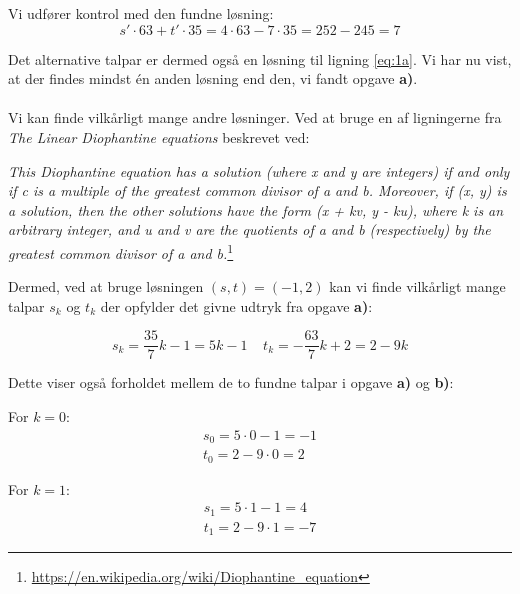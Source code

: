 Vi udfører kontrol med den fundne løsning: 
\begin{equation*}
   s' \cdot 63 + t' \cdot 35  =  4 \cdot 63 - 7 \cdot 35 = 252 - 245 = 7
\end{equation*}

Det alternative talpar er dermed også en løsning til ligning \eqref{eq:1a}. Vi har nu vist, at der findes mindst én anden løsning end den, vi fandt opgave \textbf{a)}. \\
\\
Vi kan finde vilkårligt mange andre løsninger. Ved at bruge en af ligningerne fra \textit{The Linear Diophantine equations} beskrevet ved: 

\begin{center}
\textit{This Diophantine equation has a solution (where x and y are integers) if and only if c is a multiple of the greatest common divisor of a and b. Moreover, if (x, y) is a solution, then the other solutions have the form (x + kv, y - ku), where k is an arbitrary integer, and u and v are the quotients of a and b (respectively) by the greatest common divisor of a and b.}\footnote{\url{https://en.wikipedia.org/wiki/Diophantine_equation}}
\end{center}

Dermed, ved at bruge løsningen $(s,t)=(-1, 2)$ kan vi finde vilkårligt mange talpar $s_k$ og $t_k$ der opfylder det givne udtryk fra opgave \textbf{a)}: 

\begin{equation*}
    s_k = \frac{35}{7}k -1 = 5k-1  \; \; \; \; t_k = -\frac{63}{7}k + 2 = 2-9k
\end{equation*}

Dette viser også forholdet mellem de to fundne talpar i opgave \textbf{a)} og \textbf{b)}: 

For $k = 0$:
\begin{gather*}
    s_{0} = 5 \cdot 0 -1 = -1 \\
    t_{0} = 2-9 \cdot 0 = 2
\end{gather*}

For $k = 1$: 
\begin{gather*}
    s_{1} = 5 \cdot 1 -1 = 4 \\
    t_{1} =2 -9 \cdot 1 = -7
\end{gather*}
